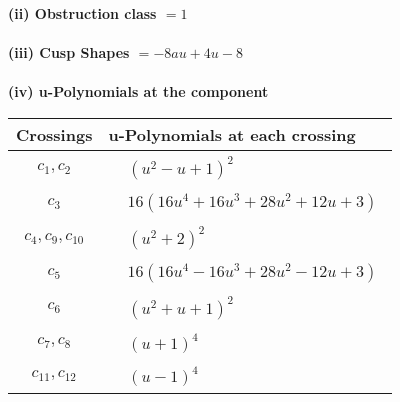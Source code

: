 \documentclass[1p]{elsarticle_modified}
\theoremstyle{definition}
\begin{document}
\flushleft \textbf{(ii) Obstruction class $= 1$}\\~\\
\flushleft \textbf{(iii) Cusp Shapes $= -8 a u+4 u-8$}\\~\\
\newpage\renewcommand{\arraystretch}{1}
\flushleft \textbf{(iv) u-Polynomials at the component}\newline \\
\begin{tabular}{m{50pt}|m{274pt}}
Crossings & \hspace{64pt}u-Polynomials at each crossing \\
\hline $$\begin{aligned}c_{1},c_{2}\end{aligned}$$&$\begin{aligned}
&(u^2- u+1)^2
\end{aligned}$\\
\hline $$\begin{aligned}c_{3}\end{aligned}$$&$\begin{aligned}
&16(16 u^4+16 u^3+28 u^2+12 u+3)
\end{aligned}$\\
\hline $$\begin{aligned}c_{4},c_{9},c_{10}\end{aligned}$$&$\begin{aligned}
&(u^2+2)^2
\end{aligned}$\\
\hline $$\begin{aligned}c_{5}\end{aligned}$$&$\begin{aligned}
&16(16 u^4-16 u^3+28 u^2-12 u+3)
\end{aligned}$\\
\hline $$\begin{aligned}c_{6}\end{aligned}$$&$\begin{aligned}
&(u^2+u+1)^2
\end{aligned}$\\
\hline $$\begin{aligned}c_{7},c_{8}\end{aligned}$$&$\begin{aligned}
&(u+1)^4
\end{aligned}$\\
\hline $$\begin{aligned}c_{11},c_{12}\end{aligned}$$&$\begin{aligned}
&(u-1)^4
\end{aligned}$\\
\hline
\end{tabular}\\~\\
\end{document}
